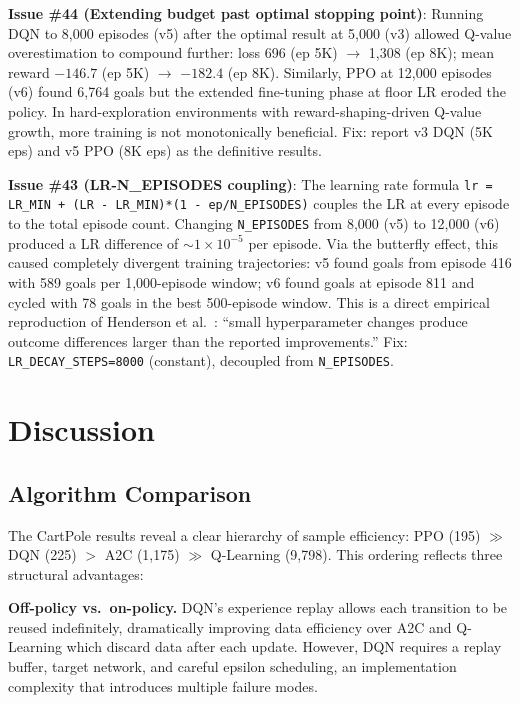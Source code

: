 \documentclass[a4paper,12pt]{article}
\begin{document}
\textbf{Issue \#44 (Extending budget past optimal stopping point)}: Running DQN to 8,000 episodes (v5) after the optimal result at 5,000 (v3) allowed Q-value overestimation to compound further: loss 696 (ep 5K) $\rightarrow$ 1,308 (ep 8K); mean reward $-146.7$ (ep 5K) $\rightarrow$ $-182.4$ (ep 8K). Similarly, PPO at 12,000 episodes (v6) found 6,764 goals but the extended fine-tuning phase at floor LR eroded the policy. In hard-exploration environments with reward-shaping-driven Q-value growth, more training is not monotonically beneficial. Fix: report v3 DQN (5K eps) and v5 PPO (8K eps) as the definitive results.

\textbf{Issue \#43 (LR-N\_EPISODES coupling)}: The learning rate formula \texttt{lr = LR\_MIN + (LR - LR\_MIN)*(1 - ep/N\_EPISODES)} couples the LR at every episode to the total episode count. Changing \texttt{N\_EPISODES} from 8,000 (v5) to 12,000 (v6) produced a LR difference of $\sim1\times10^{-5}$ per episode. Via the butterfly effect, this caused completely divergent training trajectories: v5 found goals from episode 416 with 589 goals per 1,000-episode window; v6 found goals at episode 811 and cycled with 78 goals in the best 500-episode window. This is a direct empirical reproduction of Henderson et al.\ \cite{henderson2018deep}: ``small hyperparameter changes produce outcome differences larger than the reported improvements.'' Fix: \texttt{LR\_DECAY\_STEPS=8000} (constant), decoupled from \texttt{N\_EPISODES}.

\section{Discussion}
\label{sec:discussion}

\subsection{Algorithm Comparison}

The CartPole results reveal a clear hierarchy of sample efficiency: PPO (195) $\gg$ DQN (225) $>$ A2C (1,175) $\gg$ Q-Learning (9,798). This ordering reflects three structural advantages:

\textbf{Off-policy vs.\ on-policy.} DQN's experience replay allows each transition to be reused indefinitely, dramatically improving data efficiency over A2C and Q-Learning which discard data after each update. However, DQN requires a replay buffer, target network, and careful epsilon scheduling, an implementation complexity that introduces multiple failure modes.
\end{document}
